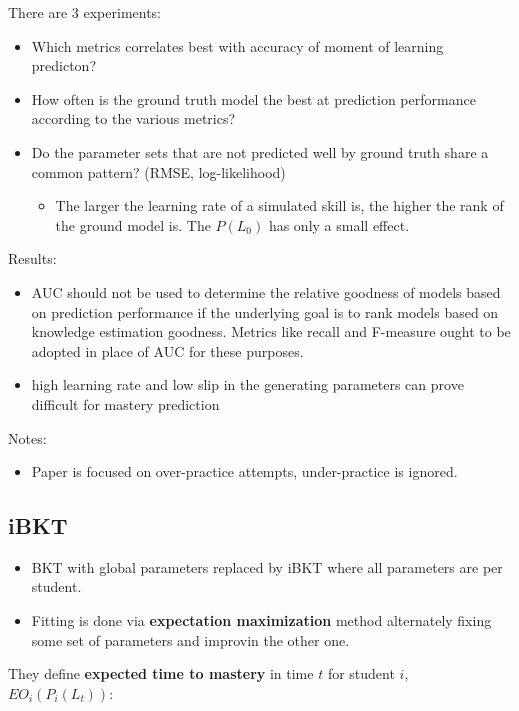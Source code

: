 \documentclass[a4paper]{article}
\begin{document}
There are 3 experiments:
\begin{itemize}
	\item	Which metrics correlates best with accuracy of moment of learning predicton?
	\item	How often is the ground truth model the best at prediction performance
		according to the various metrics?
	\item Do the parameter sets that are not predicted well by ground truth share
		a common pattern? (RMSE, log-likelihood)
		\begin{itemize}
			\item	The larger the learning rate of a simulated skill is,
				the higher the rank of the ground model is. The $P(L_0)$ has only a
				small effect.
		\end{itemize}
\end{itemize}

Results:
\begin{itemize}
	\item	AUC should not be used to determine the relative goodness of models
		based on prediction performance if the underlying goal is to rank models
		based on knowledge estimation goodness. Metrics like recall and F-measure
		ought to be adopted in place of AUC for these purposes.
	\item	high learning rate and low slip in the generating parameters can prove
		difficult for mastery prediction
\end{itemize}

Notes:
\begin{itemize}
	\item	Paper is focused on over-practice attempts, under-practice is ignored.
\end{itemize}

\subsection{iBKT \cite{lee2012impact}}

\begin{itemize}
	\item	BKT with global parameters replaced by iBKT where all parameters are per student.
	\item	Fitting is done via \textbf{expectation maximization} method alternately
		fixing some set of parameters and improvin the other one.
\end{itemize}

They define \textbf{expected time to mastery} in time $t$ for student $i$, $EO_i(P_i(L_t))$:
\end{document}
